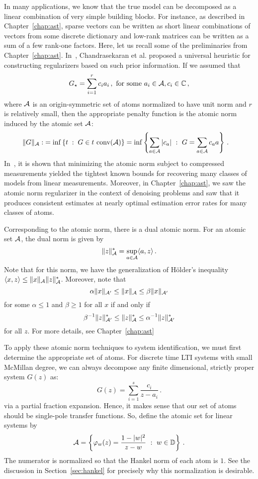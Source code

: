 In many applications, we know that the true model can be decomposed as a linear
combination of very simple building blocks. For instance, as described in
Chapter~\ref{chap:ast}, sparse vectors can be written as short linear
combinations of vectors from some discrete dictionary and low-rank matrices can
be written as a sum of a few rank-one factors. Here, let us recall some of the
preliminaries from Chapter~\ref{chap:ast}. In~\cite{crpw}, Chandrasekaran et al.
proposed a universal heuristic for constructing regularizers based on such prior
information. If we assumed that
\[
	G_\star = \sum_{i=1}^r c_i a_i\,,~\mbox{for some}~a_i\in\mathcal{A},c_i\in \mathbb{C}\,,
\]
where $\mathcal{A}$ is an origin-symmetric set of atoms normalized to have unit norm and
$r$ is relatively small, then the appropriate penalty function is the atomic
norm induced by the atomic set $\mathcal{A}$:
\begin{equation}\label{eq:atomic-norm-def}
\begin{split}
	\|G\|_{\mathcal{A}}: & = \inf\left\{ t \; : \; G \in t\text{ conv}(\mathcal{A})  \right\}  =\inf\left\{ \sum_{a\in \mathcal{A}} |c_a|~:~G = \sum_{a\in \mathcal{A}} c_a a\right\}\,.
\end{split}
\end{equation}
In~\cite{crpw}, it is shown that minimizing the atomic norm subject to
compressed measurements yielded the tightest known bounds for recovering many
classes of models from linear measurements. Moreover, in Chapter~\ref{chap:ast},
we saw the atomic norm regularizer in the context of denoising problems and
saw that it produces consistent estimates at nearly optimal estimation error
rates for many classes of atoms.

Corresponding to the atomic norm, there is a dual atomic norm.  For an atomic set $\mathcal{A}$, the dual norm is given by
\[
	\| z \|_{\mathcal{A}}^* = \sup_{a \in \mathcal{A}} \langle a, z \rangle\,.
\] 
Note that for this norm, we have the generalization of H\"{o}lder's inequality $\langle x,z\rangle \leq \|x\|_{\mathcal{A}}\|z\|_{\mathcal{A}}^*$.  Moreover, note that
\[
	 \alpha \|x\|_{\mathcal{A}'} \leq \|x\|_{\mathcal{A}} \leq \beta\|x\|_{\mathcal{A}'}
\]
for some $\alpha\leq 1$ and $\beta\geq 1$ for all $x$ if and only if
\[
	 \beta^{-1} \|z\|_{\mathcal{A}'}^* \leq \|z\|_{\mathcal{A}}^* \leq \alpha^{-1}\|z\|_{\mathcal{A}'}^*
\]
for all $z$. For more details, see Chapter~\ref{chap:ast}

To apply these atomic norm techniques to system identification, we must first
determine the appropriate set of atoms. For discrete time LTI systems with small
McMillan degree, we can always decompose any finite dimensional, strictly proper
system $G(z)$ as:
$$
G(z)=\sum_{i=1}^{s} \frac{c_i}{z-a_i}\,.
$$
via a partial fraction expansion. Hence, it makes sense that our set of atoms
should be single-pole transfer functions. So, define the atomic set for linear
systems by
\[
\mathcal{A} = \left\{ \varphi_{w}(z) = \frac{1-|w|^2}{z-w} ~:~w\in \mathbb{D}\right\}\,.
\]
The numerator is normalized so that the Hankel norm of each atom is $1$. See the
discussion in Section~\ref{sec:hankel} for precisely why this normalization is
desirable.

